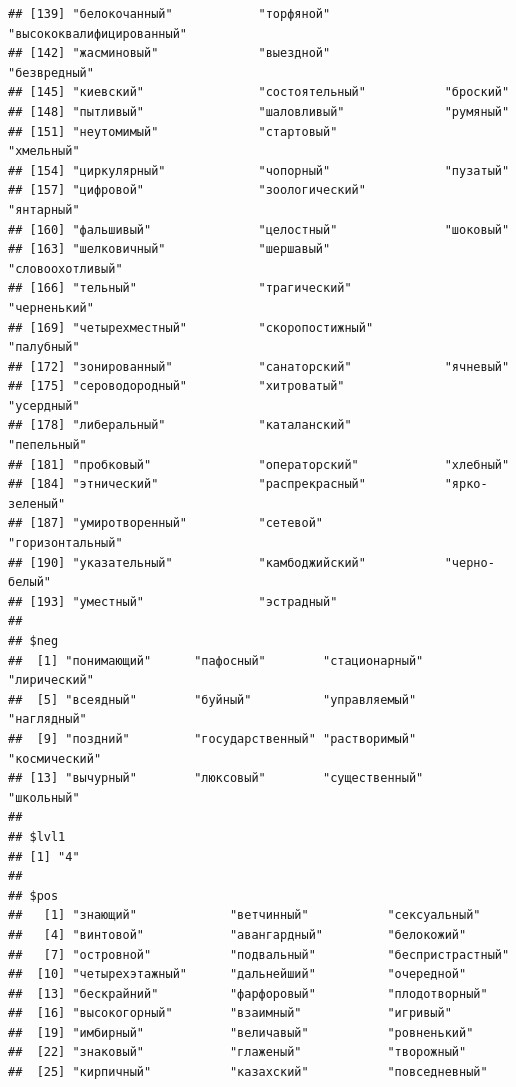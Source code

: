 \documentclass[11pt]{article}\usepackage[]{graphicx}\usepackage[]{color}
\makeatletter
\newenvironment{kframe}{%
 \def\at@end@of@kframe{}%
 \ifinner\ifhmode%
  \def\at@end@of@kframe{\end{minipage}}%
  \begin{minipage}{\columnwidth}%
 \fi\fi%
 \def\FrameCommand##1{\hskip\@totalleftmargin \hskip-\fboxsep
 \colorbox{shadecolor}{##1}\hskip-\fboxsep
     \hskip-\linewidth \hskip-\@totalleftmargin \hskip\columnwidth}%
 \MakeFramed {\advance\hsize-\width
   \@totalleftmargin\z@ \linewidth\hsize
   \@setminipage}}%
 {\par\unskip\endMakeFramed%
 \at@end@of@kframe}
\newenvironment{knitrout}{}{} %
\makeatother
\begin{document}
\begin{knitrout}
\begin{kframe}
\begin{verbatim}
## [139] "белокочанный"            "торфяной"                "высококвалифицированный"
## [142] "жасминовый"              "выездной"                "безвредный"             
## [145] "киевский"                "состоятельный"           "броский"                
## [148] "пытливый"                "шаловливый"              "румяный"                
## [151] "неутомимый"              "стартовый"               "хмельный"               
## [154] "циркулярный"             "чопорный"                "пузатый"                
## [157] "цифровой"                "зоологический"           "янтарный"               
## [160] "фальшивый"               "целостный"               "шоковый"                
## [163] "шелковичный"             "шершавый"                "словоохотливый"         
## [166] "тельный"                 "трагический"             "черненький"             
## [169] "четырехместный"          "скоропостижный"          "палубный"               
## [172] "зонированный"            "санаторский"             "ячневый"                
## [175] "сероводородный"          "хитроватый"              "усердный"               
## [178] "либеральный"             "каталанский"             "пепельный"              
## [181] "пробковый"               "операторский"            "хлебный"                
## [184] "этнический"              "распрекрасный"           "ярко-зеленый"           
## [187] "умиротворенный"          "сетевой"                 "горизонтальный"         
## [190] "указательный"            "камбоджийский"           "черно-белый"            
## [193] "уместный"                "эстрадный"              
## 
## $neg
##  [1] "понимающий"      "пафосный"        "стационарный"    "лирический"     
##  [5] "всеядный"        "буйный"          "управляемый"     "наглядный"      
##  [9] "поздний"         "государственный" "растворимый"     "космический"    
## [13] "вычурный"        "люксовый"        "существенный"    "школьный"       
## 
## $lvl1
## [1] "4"
## 
## $pos
##   [1] "знающий"             "ветчинный"           "сексуальный"        
##   [4] "винтовой"            "авангардный"         "белокожий"          
##   [7] "островной"           "подвальный"          "беспристрастный"    
##  [10] "четырехэтажный"      "дальнейший"          "очередной"          
##  [13] "бескрайний"          "фарфоровый"          "плодотворный"       
##  [16] "высокогорный"        "взаимный"            "игривый"            
##  [19] "имбирный"            "величавый"           "ровненький"         
##  [22] "знаковый"            "глаженый"            "творожный"          
##  [25] "кирпичный"           "казахский"           "повседневный"       

\end{verbatim}
\end{kframe}
\end{knitrout}
\end{document}
